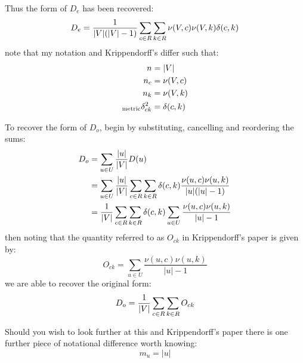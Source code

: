 \documentclass{article}
\begin{document}
Thus the form of $D_e$ has been recovered:
\begin{equation}
D_e = \frac{1}{|V|(|V| - 1)} \sum_{c \in R} \sum_{k \in R} \nu(V, c) \nu(V, k) \delta(c, k)
\end{equation}
note that my notation and Krippendorff's differ such that:
\begin{align}
n &= |V| \\
n_c &= \nu(V, c) \\
n_k &= \nu(V, k) \\
{}_{\rm{metric}}\delta^2_{ck} &= \delta(c, k)
\end{align}

To recover the form of $D_o$, begin by substituting, cancelling and reordering
the sums:
\begin{align}
D_o &= \sum_{u \in U} \frac{|u|}{|V|} D(u) \nonumber \\
&= \sum_{u \in U} \frac{|u|}{|V|} \sum_{c \in R} \sum_{k \in R} \delta(c, k) \frac{\nu(u, c) \nu(u, k)}{|u|(|u| - 1)} \nonumber \\
&= \frac{1}{|V|} \sum_{c \in R} \sum_{k \in R} \delta(c, k) \sum_{u \in U} \frac{\nu(u, c) \nu(u, k)}{|u| - 1}
\end{align}
then noting that the quantity referred to as $O_{ck}$ in Krippendorff's paper is given by:
\begin{equation}
O_{ck} = \sum_{u \in U} \frac{\nu(u, c) \nu(u, k)}{|u| - 1}
\end{equation}
we are able to recover the original form:
\begin{equation}
D_o = \frac{1}{|V|} \sum_{c \in R} \sum_{k \in R} O_{ck}
\end{equation}

Should you wish to look further at this and Krippendorff's paper there is one
further piece of notational difference worth knowing:
\begin{equation}
m_u = |u|
\end{equation}



\end{document}
